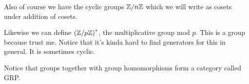 \documentclass[12pt, twosided]{article}
\begin{document}
  \begin{exa}
    Also of course we have the cyclic groups \(\mathbb{Z} / n\mathbb{Z}\) which we will write as cosets under addition of cosets.

    Likewise we can define
    \(\left( \mathbb{Z} / p\mathbb{Z} \right)^*\), the multiplicative group mod \(p\). This is a group because trust me. Notice that it's kinda hard to find generators for this in general. It is sometimes cyclic.
  \end{exa}

  Notice that groups together with group homomorphisms form a category called GRP.

  \begin{center}
  \end{center}
\end{document}
